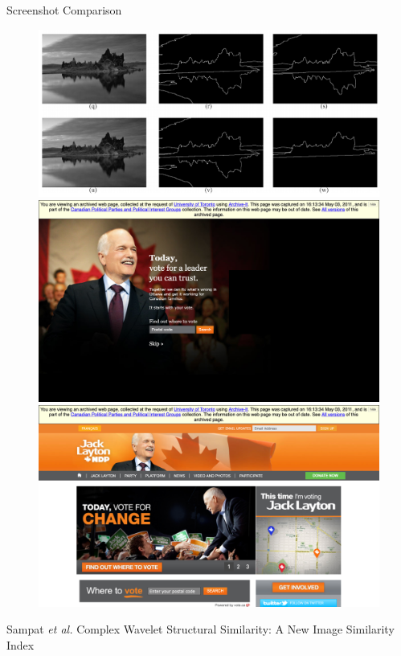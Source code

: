 \documentclass[10pt]{beamer}
\begin{document}
\begin{frame}{Screenshot Comparison}
\begin{figure}
\centering
\includegraphics[scale=0.25]{SSIM}\\
\includegraphics[scale=0.06]{../homepage-images-ndp/52-ndp}
\includegraphics[scale=0.06]{../homepage-images-ndp/53-ndp}
\end{figure}

\footnotesize{Sampat \textit{et al.} Complex Wavelet Structural Similarity: A New Image Similarity Index}
\end{frame}
\end{document}
